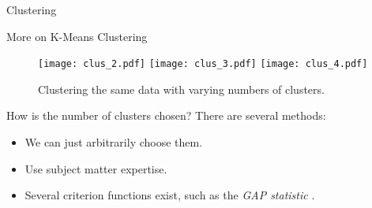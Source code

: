 \documentclass[8pt]{beamer}
\newcommand{\mydef}[1]{\textcolor{SteelBlue3}{\textit{#1}}} %
\begin{document}
\begin{frame}{Clustering}

\end{frame}

\begin{frame}{More on K-Means Clustering}

\begin{figure}
    \centering
    \texttt{[image: clus\_2.pdf]}
    \texttt{[image: clus\_3.pdf]}
    \texttt{[image: clus\_4.pdf]}
    \caption{Clustering the same data with varying numbers of clusters.}
    \label{mult_cluster}
\end{figure} %

How is the number of clusters chosen? There are several methods: %
\begin{itemize}
    \item We can just arbitrarily choose them. %
    \item Use subject matter expertise. %
    \item Several criterion functions exist, such as the \mydef{GAP statistic} \cite{tibshirani2001estimating}.
\end{itemize}
    
\end{frame}
\end{document}
